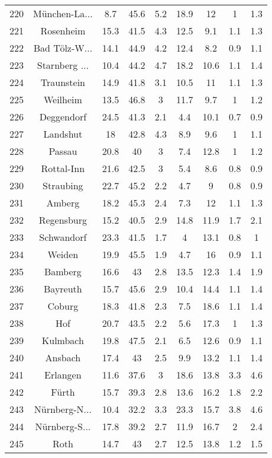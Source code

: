 \begin{table}[!htbp]
\begin{tabular}{@{\extracolsep{5pt}} ccccccccc}
220 & München-La... & 8.7 & 45.6 & 5.2 & 18.9 & 12 & 1 & 1.3 \\ 
221 & Rosenheim & 15.3 & 41.5 & 4.3 & 12.5 & 9.1 & 1.1 & 1.3 \\ 
222 & Bad Tölz-W... & 14.1 & 44.9 & 4.2 & 12.4 & 8.2 & 0.9 & 1.1 \\ 
223 & Starnberg ... & 10.4 & 44.2 & 4.7 & 18.2 & 10.6 & 1.1 & 1.4 \\ 
224 & Traunstein & 14.9 & 41.8 & 3.1 & 10.5 & 11 & 1.1 & 1.3 \\ 
225 & Weilheim & 13.5 & 46.8 & 3 & 11.7 & 9.7 & 1 & 1.2 \\ 
226 & Deggendorf & 24.5 & 41.3 & 2.1 & 4.4 & 10.1 & 0.7 & 0.9 \\ 
227 & Landshut & 18 & 42.8 & 4.3 & 8.9 & 9.6 & 1 & 1.1 \\ 
228 & Passau & 20.8 & 40 & 3 & 7.4 & 12.8 & 1 & 1.2 \\ 
229 & Rottal-Inn & 21.6 & 42.5 & 3 & 5.4 & 8.6 & 0.8 & 0.9 \\ 
230 & Straubing & 22.7 & 45.2 & 2.2 & 4.7 & 9 & 0.8 & 0.9 \\ 
231 & Amberg & 18.2 & 45.3 & 2.4 & 7.3 & 12 & 1.1 & 1.3 \\ 
232 & Regensburg & 15.2 & 40.5 & 2.9 & 14.8 & 11.9 & 1.7 & 2.1 \\ 
233 & Schwandorf & 23.3 & 41.5 & 1.7 & 4 & 13.1 & 0.8 & 1 \\ 
234 & Weiden & 19.9 & 45.5 & 1.9 & 4.7 & 16 & 0.9 & 1.1 \\ 
235 & Bamberg & 16.6 & 43 & 2.8 & 13.5 & 12.3 & 1.4 & 1.9 \\ 
236 & Bayreuth & 15.7 & 45.6 & 2.9 & 10.4 & 14.4 & 1.1 & 1.4 \\ 
237 & Coburg & 18.3 & 41.8 & 2.3 & 7.5 & 18.6 & 1.1 & 1.4 \\ 
238 & Hof & 20.7 & 43.5 & 2.2 & 5.6 & 17.3 & 1 & 1.3 \\ 
239 & Kulmbach & 19.8 & 47.5 & 2.1 & 6.5 & 12.6 & 0.9 & 1.1 \\ 
240 & Ansbach & 17.4 & 43 & 2.5 & 9.9 & 13.2 & 1.1 & 1.4 \\ 
241 & Erlangen & 11.6 & 37.6 & 3 & 18.6 & 13.8 & 3.3 & 4.6 \\ 
242 & Fürth & 15.7 & 39.3 & 2.8 & 13.6 & 16.2 & 1.8 & 2.2 \\ 
243 & Nürnberg-N... & 10.4 & 32.2 & 3.3 & 23.3 & 15.7 & 3.8 & 4.6 \\ 
244 & Nürnberg-S... & 17.8 & 39.2 & 2.7 & 11.9 & 16.7 & 2 & 2.4 \\ 
245 & Roth & 14.7 & 43 & 2.7 & 12.5 & 13.8 & 1.2 & 1.5 \\ 

\end{tabular}
\end{table}
